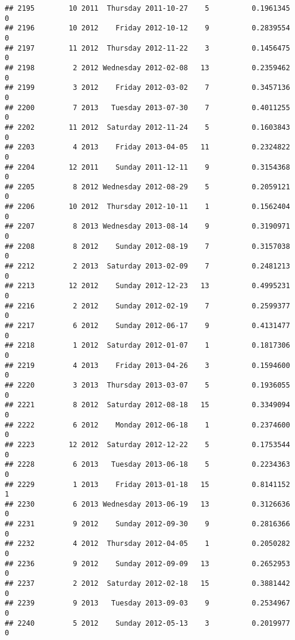 \documentclass[
]{article}
\begin{document}
\begin{verbatim}
## 2195        10 2011  Thursday 2011-10-27    5          0.1961345             0
## 2196        10 2012    Friday 2012-10-12    9          0.2839554             0
## 2197        11 2012  Thursday 2012-11-22    3          0.1456475             0
## 2198         2 2012 Wednesday 2012-02-08   13          0.2359462             0
## 2199         3 2012    Friday 2012-03-02    7          0.3457136             0
## 2200         7 2013   Tuesday 2013-07-30    7          0.4011255             0
## 2202        11 2012  Saturday 2012-11-24    5          0.1603843             0
## 2203         4 2013    Friday 2013-04-05   11          0.2324822             0
## 2204        12 2011    Sunday 2011-12-11    9          0.3154368             0
## 2205         8 2012 Wednesday 2012-08-29    5          0.2059121             0
## 2206        10 2012  Thursday 2012-10-11    1          0.1562404             0
## 2207         8 2013 Wednesday 2013-08-14    9          0.3190971             0
## 2208         8 2012    Sunday 2012-08-19    7          0.3157038             0
## 2212         2 2013  Saturday 2013-02-09    7          0.2481213             0
## 2213        12 2012    Sunday 2012-12-23   13          0.4995231             0
## 2216         2 2012    Sunday 2012-02-19    7          0.2599377             0
## 2217         6 2012    Sunday 2012-06-17    9          0.4131477             0
## 2218         1 2012  Saturday 2012-01-07    1          0.1817306             0
## 2219         4 2013    Friday 2013-04-26    3          0.1594600             0
## 2220         3 2013  Thursday 2013-03-07    5          0.1936055             0
## 2221         8 2012  Saturday 2012-08-18   15          0.3349094             0
## 2222         6 2012    Monday 2012-06-18    1          0.2374600             0
## 2223        12 2012  Saturday 2012-12-22    5          0.1753544             0
## 2228         6 2013   Tuesday 2013-06-18    5          0.2234363             0
## 2229         1 2013    Friday 2013-01-18   15          0.8141152             1
## 2230         6 2013 Wednesday 2013-06-19   13          0.3126636             0
## 2231         9 2012    Sunday 2012-09-30    9          0.2816366             0
## 2232         4 2012  Thursday 2012-04-05    1          0.2050282             0
## 2236         9 2012    Sunday 2012-09-09   13          0.2652953             0
## 2237         2 2012  Saturday 2012-02-18   15          0.3881442             0
## 2239         9 2013   Tuesday 2013-09-03    9          0.2534967             0
## 2240         5 2012    Sunday 2012-05-13    3          0.2019977             0

\end{verbatim}
\end{document}
